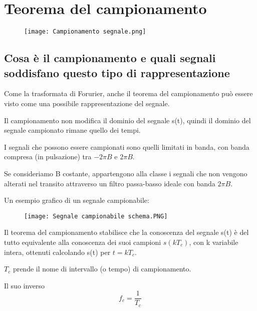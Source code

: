 \chapter{Teorema del campionamento} 

\begin{figure}[h]
    \centering
    \texttt{[image: Campionamento segnale.png]}
\end{figure}  

\newpage 

\section{Cosa è il campionamento e quali segnali soddisfano questo tipo di rappresentazione} 

Come la trasformata di Forurier, anche il teorema del campionamento può essere visto come una 
possibile rappresentazione del segnale. \newline 

Il campionamento non modifica il dominio del segnale s(t), quindi il dominio del segnale campionato 
rimane quello dei tempi. \newline 

I segnali che possono essere campionati sono quelli limitati in banda, con banda compresa (in pulsazione) tra 
$-2\pi B$ e $2\pi B$. \newline 

Se consideriamo B costante, appartengono alla classe i segnali che non vengono alterati nel transito 
attraverso un filtro passa-basso ideale con banda $2 \pi B$. \newline 

Un esempio grafico di un segnale campionabile: 

\begin{figure}[h]
    \centering
    \texttt{[image: Segnale campionabile schema.PNG]}
\end{figure}  

Il teorema del campionamento stabilisce che la conoscenza del segnale s(t) è del tutto 
equivalente alla conoscenza dei suoi campioni $s(k T_c)$, con k variabile intera, 
ottenuti calcolando s(t) per $t=kT_c$. \newline 

$T_c$ prende il nome di intervallo (o tempo) di campionamento. \newline 

Il suo inverso 
{
    \Large 
    \begin{equation}
        f_c = \frac{1}{T_c}    
    \end{equation}
}

